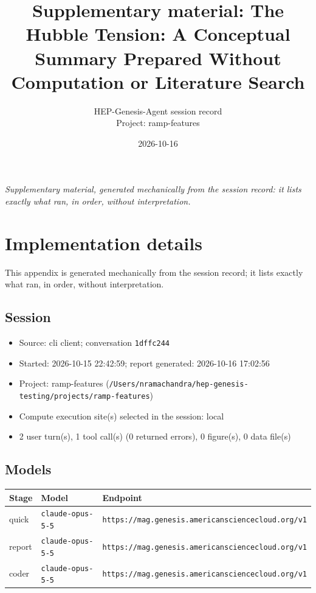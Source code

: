 \documentclass[11pt,a4paper]{article}
\title{Supplementary material: The Hubble Tension: A Conceptual Summary Prepared Without Computation or Literature Search}
\author{HEP-Genesis-Agent session record \\ \small Project: ramp-features}
\date{2026-10-16}
\begin{document}
\maketitle
\noindent\textit{\small Supplementary material, generated mechanically from the session record: it lists exactly what ran, in order, without interpretation.}
\vspace{1em}



\appendix
\section{Implementation details}
\label{app:impl}
This appendix is generated mechanically from the session record; it lists exactly what ran, in order, without interpretation.
\subsection{Session}
\begin{itemize}
  \item Source: cli client; conversation \texttt{1dffc244}
  \item Started: 2026-10-15 22:42:59; report generated: 2026-10-16 17:02:56
  \item Project: ramp-features (\texttt{/\allowbreak{}Users/\allowbreak{}nramachandra/\allowbreak{}hep-genesis-testing/\allowbreak{}projects/\allowbreak{}ramp-features})
  \item Compute execution site(s) selected in the session: local
  \item 2 user turn(s), 1 tool call(s) (0 returned errors), 0 figure(s), 0 data file(s)
\end{itemize}
\subsection{Models}
\begin{longtable}{@{}p{}p{}p{}@{}}
\toprule Stage & Model & Endpoint \\ \midrule \endhead
quick & \texttt{claude-opus-5-5} & \texttt{https:\allowbreak{}/\allowbreak{}/\allowbreak{}mag.genesis.americansciencecloud.org/\allowbreak{}v1} \\
report & \texttt{claude-opus-5-5} & \texttt{https:\allowbreak{}/\allowbreak{}/\allowbreak{}mag.genesis.americansciencecloud.org/\allowbreak{}v1} \\
coder & \texttt{claude-opus-5-5} & \texttt{https:\allowbreak{}/\allowbreak{}/\allowbreak{}mag.genesis.americansciencecloud.org/\allowbreak{}v1} \\
\bottomrule\end{longtable}
\end{document}
